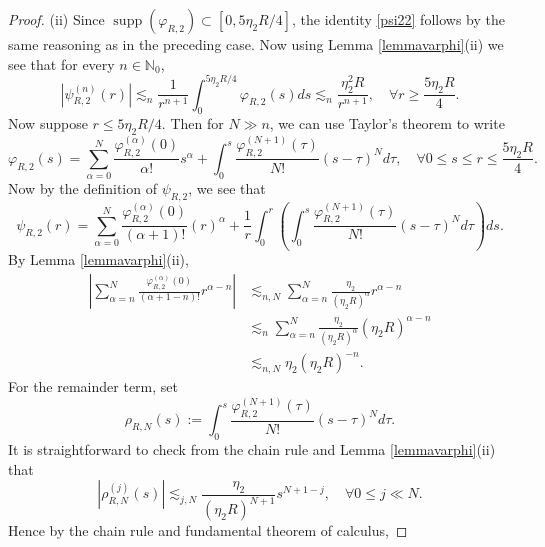 \documentclass[reqno,11pt]{amsart}
\theoremstyle{plain}
\theoremstyle{definition}
\numberwithin{equation}{section}
\numberwithin{theorem}{section}
\def\geq{\geqslant}
\def\leq{\leqslant}
\begin{document}
\begin{proof}
(ii) Since $\operatorname{supp}\left(\varphi_{R, 2}\right) \subset\left[0,5 \eta_{2} R / 4\right]$, the identity \eqref{psi22} follows by the same reasoning as in the preceding case. Now using Lemma \ref{lemmavarphi}(ii) we see that for every $n \in \mathbb{N}_{0}$,
\begin{equation*}
\left|\psi_{R, 2}^{(n)}(r)\right| \lesssim_{n} \frac{1}{r^{n+1}} \int_{0}^{5 \eta_{2} R / 4} \varphi_{R, 2}(s) d s \lesssim_n \frac{\eta_{2}^{2} R}{r^{n+1}}, \quad \forall r \geq \frac{5 \eta_{2} R}{4 } .
\end{equation*}
Now suppose $r \leq 5 \eta_{2} R/4$. Then for $N \gg n$, we can use Taylor's theorem to write
\begin{equation*}
\varphi_{R, 2}(s)=\sum_{\alpha=0}^{N} \frac{\varphi_{R, 2}^{(\alpha)}(0)}{\alpha!} s^{\alpha}+\int_{0}^{s} \frac{\varphi_{R, 2}^{(N+1)}(\tau)}{N!}(s-\tau)^{N} d \tau, \quad \forall 0 \leq s \leq r \leq \frac{5 \eta_{2} R}{4} . 
\end{equation*}
Now by the definition of $\psi_{R, 2}$, we see that
\begin{equation*}
\psi_{R,  2}(r)=\sum_{\alpha=0}^{N} \frac{\varphi_{R, 2}^{(\alpha)}(0)}{(\alpha+1)!}\left(r\right)^{\alpha}+\frac{1}{r} \int_{0}^{r}\left(\int_{0}^{s} \frac{\varphi_{R, 2}^{(N+1)}(\tau)}{N!}(s-\tau)^{N} d \tau\right) d s .
\end{equation*}
By Lemma \ref{lemmavarphi}(ii),
\begin{align*}
\left|\sum_{\alpha=n}^{N} \frac{\varphi_{R, 2}^{(\alpha)}(0)}{(\alpha+1-n)!} r^{\alpha-n}\right| & \lesssim_{n, N} \sum_{\alpha=n}^{N} \frac{\eta_{2}}{\left(\eta_{2} R\right)^{\alpha}} r^{\alpha-n} \\
& \lesssim_{n} \sum_{\alpha=n}^{N} \frac{\eta_{2}}{\left(\eta_{2} R\right)^{\alpha}}\left(\eta_2R\right)^{\alpha-n} \\
& \lesssim_{n, N} \eta_{2}\left(\eta_{2} R\right)^{-n} .
\end{align*}
For the remainder term, set
\begin{equation*}
\rho_{R, N}(s):=\int_{0}^{s} \frac{\varphi_{R, 2}^{(N+1)}(\tau)}{N!}(s-\tau)^{N} d \tau.
\end{equation*}
It is straightforward to check from the chain rule and Lemma \ref{lemmavarphi}(ii) that
\begin{equation}\label{phoest}
\left|\rho_{R, N}^{(j)}(s)\right| \lesssim_{j, N} \frac{\eta_{2}}{\left(\eta_{2} R\right)^{N+1}} s^{N+1-j}, \quad \forall 0 \leq j \ll N.
\end{equation}
Hence by the chain rule and fundamental theorem of calculus,

\end{proof}
\end{document}
